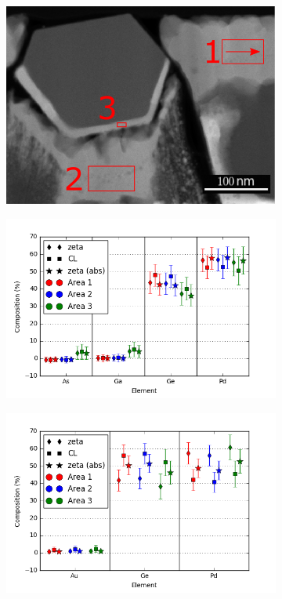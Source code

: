 \begin{figure}[h!]
	\centering
	\begin{subfigure}{nonheated-images-in-overview (correct)3\textwidth}
		\includegraphics[width=\textwidth]{fig/q/B-C-F/BCF}
		\caption{}
		\label{fig:BCF-overview}
	\end{subfigure}
	\hfill
	\begin{subfigure}{0.7\textwidth}
		\includegraphics[width=\textwidth]{fig/q/B-C-F/AsGaGePd-GeKline-std}
		\caption{}
		\label{fig:BCF1}
	\end{subfigure}
	\hfill
	\begin{subfigure}{0.7\textwidth}
		\includegraphics[width=\textwidth]{fig/q/B-C-F/AuGePd-std}

\end{subfigure}
\end{figure}
